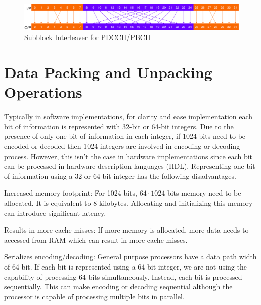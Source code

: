 \begin{figure}[h]
	\centering
	\includegraphics[width=1\textwidth]{./figures/subblockInterleaver.pdf}
	\caption{Subblock Interleaver for PDCCH/PBCH}
	\label{fig:subblockInterleaver}
\end{figure}

\section{Data Packing and Unpacking Operations} \label{dataPackUnpack}
Typically in software implementations, for clarity and ease implementation each bit of information is represented with 32-bit or 64-bit integers. Due to the presence of only one bit of information in each integer, if 1024 bits need to be encoded or decoded then 1024 integers are involved in encoding or decoding process. However, this isn't the case in hardware implementations since each bit can be processed in hardware description languages (HDL). Representing one bit of information using a 32 or 64-bit integer has the following disadvantages.

\begin{description}[font=$\bullet$~\normalfont]
	\item Increased memory footprint: For 1024 bits, $64\cdot1024$ bits memory need to be allocated. It is equivalent to 8 kilobytes. Allocating and initializing this memory can introduce significant latency.
	\item Results in more cache misses: If more memory is allocated, more data needs to accessed from RAM which can result in more cache misses.
	\item Serializes encoding/decoding: General purpose processors have a data path width of 64-bit. If each bit is represented using a 64-bit integer, we are not using the capability of processing 64 bits simultaneously. Instead, each bit is processed sequentially. This can make encoding or decoding sequential although the processor is capable of processing multiple bits in parallel.
\end{description}

